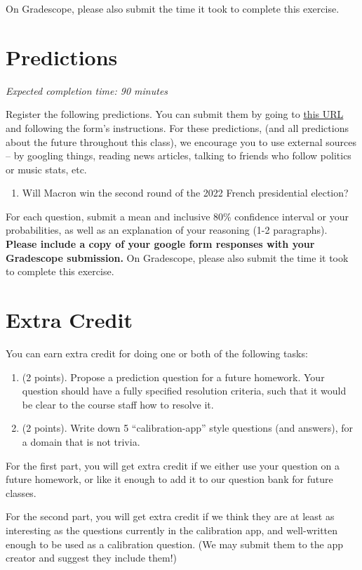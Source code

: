 \documentclass[11pt]{article}
\begin{document}
On Gradescope, please also submit the time it took to complete this exercise.

\section*{Predictions}

\emph{Expected completion time: 90 minutes}

Register the following predictions. You can submit them by going to \href{https://docs.google.com/forms/d/e/1FAIpQLSeMnjW4dLgLBFrIVr0n4-KjeakEj00KlN4PCfIRmHAvGj95kQ/viewform?usp=sf_link}{this URL} and following the form's instructions. For these predictions, (and all predictions about the future throughout this class), we encourage you to use external sources -- by googling things, reading news articles, talking to friends who follow politics or music stats, etc.

\begin{enumerate}
	\item Will Macron win the second round of the 2022 French presidential election?
\end{enumerate}

For each question, submit a mean and inclusive 80\% confidence interval or your probabilities, as well as an explanation of your reasoning (1-2 paragraphs). \textbf{Please include a copy of your google form responses with your Gradescope submission.} On Gradescope, please also submit the time it took to complete this exercise.

\section*{Extra Credit}

You can earn extra credit for doing one or both of the following tasks:
\begin{enumerate}
\item (2 points). Propose a prediction question for a future homework. Your question should have a fully specified resolution criteria, 
      such that it would be clear to the course staff how to resolve it.
\item (2 points). Write down 5 ``calibration-app'' style questions (and answers), for a domain that is not trivia.
\end{enumerate}

For the first part, you will get extra credit if we either use your question on a future homework, 
or like it enough to add it to our question bank for future classes.

For the second part, you will get extra credit if we think they are at least as interesting as the 
questions currently in the calibration app, and well-written enough to be used as a calibration question. 
(We may submit them to the app creator and suggest they include them!)
\end{document}
